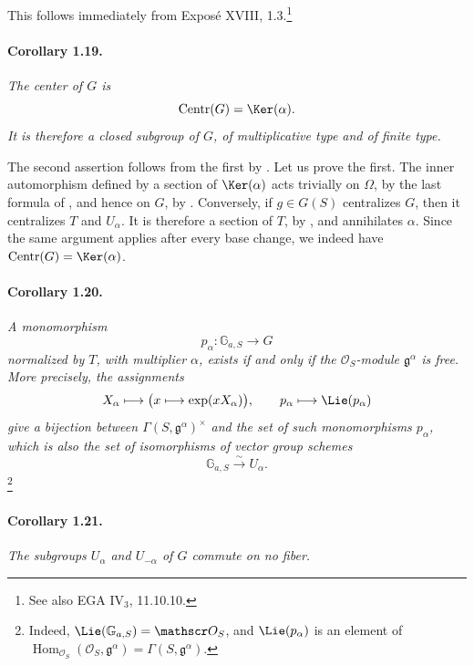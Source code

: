 This follows immediately from Exposé XVIII, 1.3.\footnote{See also
EGA IV\(_3\), 11.10.10.}

\paragraph{\textbf{Corollary 1.19.}}
\emph{The center of \(G\) is}
\[
  \operatorname{Centr}(G)=\Ker(\alpha).
\]
\emph{It is therefore a closed subgroup of \(G\), of
multiplicative type and of finite type.}

The second assertion follows from the first by . Let
us prove the first. The inner automorphism defined by a section of
\(\Ker(\alpha)\) acts trivially on \(\Omega\), by the last formula
of , and hence on \(G\), by . Conversely, if
\(g\in G(S)\) centralizes \(G\), then it centralizes \(T\) and
\(U_\alpha\). It is therefore a section of \(T\), by , and annihilates \(\alpha\). Since the same argument applies
after every base change, we indeed have
\(\operatorname{Centr}(G)=\Ker(\alpha)\).

\paragraph{\textbf{Corollary 1.20.}}
\emph{A monomorphism
\[
  p_\alpha\colon\mathbb G_{a,S}\longrightarrow G
\]
normalized by \(T\), with multiplier \(\alpha\), exists if and
only if the \(\mathscr O_S\)-module \(\mathfrak g^\alpha\) is
free. More precisely, the assignments}
\[
  X_\alpha\longmapsto
    \bigl(x\longmapsto\exp(xX_\alpha)\bigr),
  \qquad
  p_\alpha\longmapsto\Lie(p_\alpha)
\]
\emph{give a bijection between
\(\Gamma(S,\mathfrak g^\alpha)^\times\) and the set of such
monomorphisms \(p_\alpha\), which is also the set of isomorphisms
of vector group schemes}
\[
  \mathbb G_{a,S}\xrightarrow{\sim}U_\alpha.
\]
\footnote{Indeed,
\(\Lie(\mathbb G_{a,S})=\mathscr O_S\), and
\(\Lie(p_\alpha)\) is an element of
\(\operatorname{Hom}_{\mathscr O_S}
  (\mathscr O_S,\mathfrak g^\alpha)
=\Gamma(S,\mathfrak g^\alpha)\).}

\paragraph{\textbf{Corollary 1.21.}}
\emph{The subgroups \(U_\alpha\) and \(U_{-\alpha}\) of \(G\)
commute on no fiber.}

